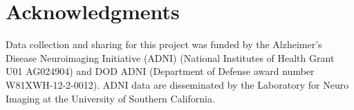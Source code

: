 \documentclass{article}
\begin{document}
%
%
%
%

 
\section*{Acknowledgments} 
 
Data collection and sharing for this project was funded by the Alzheimer's Disease Neuroimaging Initiative (ADNI) (National Institutes of Health Grant U01 AG024904) and DOD ADNI (Department of Defense award number W81XWH-12-2-0012). ADNI data are disseminated by the Laboratory for Neuro Imaging at the University of Southern California.



\end{document}
